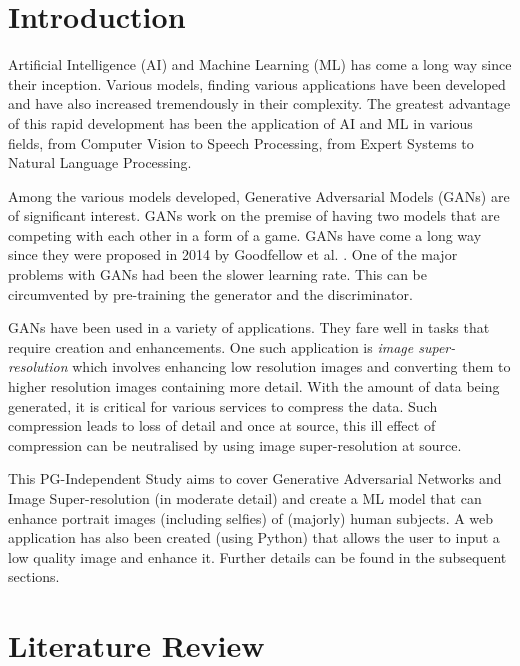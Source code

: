 \documentclass[conference]{IEEEtran}
\begin{document}
	\section{Introduction}
		Artificial Intelligence (AI) and Machine Learning (ML) has come a long way since their inception. Various models, finding various applications have been developed and have also increased tremendously in their complexity. The greatest advantage of this rapid development has been the application of AI and ML in various fields, from Computer Vision to Speech Processing, from Expert Systems to Natural Language Processing.
		\par Among the various models developed, Generative Adversarial Models (GANs) are of significant interest. GANs work on the premise of having two models that are competing with each other in a form of a game. GANs have come a long way since they were proposed in 2014 by Goodfellow et al. \cite{b1}. One of the major problems with GANs had been the slower learning rate. This can be circumvented by pre-training the generator and the discriminator.
		\par GANs have been used in a variety of applications. They fare well in tasks that require creation and enhancements. One such application is \emph{image super-resolution} which involves enhancing low resolution images and converting them to higher resolution images containing more detail. With the amount of data being generated, it is critical for various services to compress the data. Such compression leads to loss of detail and once at source, this ill effect of compression can be neutralised by using image super-resolution at source.
		\par This PG-Independent Study aims to cover Generative Adversarial Networks and Image Super-resolution (in moderate detail) and create a ML model that can enhance portrait images (including selfies) of (majorly) human subjects. A web application has also been created (using Python) that allows the user to input a low quality image and enhance it. Further details can be found in the subsequent sections.
	
	\section{Literature Review}
	
\end{document}
